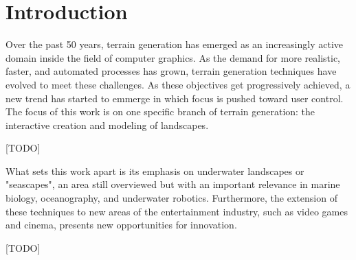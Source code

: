 \chapter{Introduction}
\label{chap:introduction}

Over the past 50 years, terrain generation has emerged as an increasingly active domain inside the field of computer graphics. As the demand for more realistic, faster, and automated processes has grown, terrain generation techniques have evolved to meet these challenges. As these objectives get progressively achieved, a new trend has started to emmerge in which focus is pushed toward user control. The focus of this work is on one specific branch of terrain generation: the interactive creation and modeling of landscapes.

[TODO]

What sets this work apart is its emphasis on underwater landscapes or "seascapes", an area still overviewed but with an important relevance in marine biology, oceanography, and underwater robotics. Furthermore, the extension of these techniques to new areas of the entertainment industry, such as video games and cinema, presents new opportunities for innovation.

[TODO]

